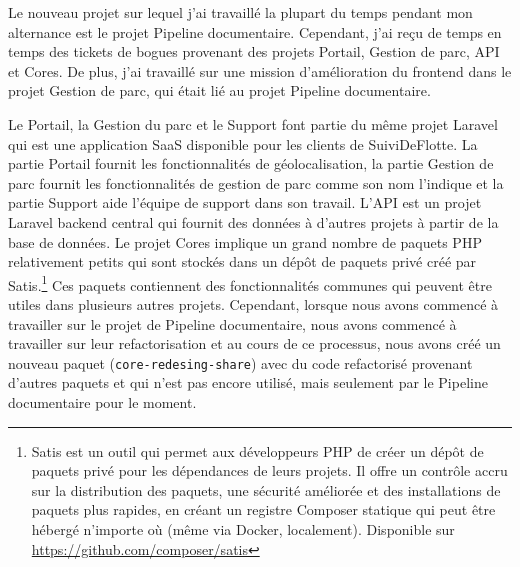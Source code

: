 Le nouveau projet sur lequel j'ai travaillé la plupart du temps pendant mon alternance est le projet Pipeline documentaire. Cependant, j'ai reçu de temps en temps des tickets de bogues provenant des projets Portail, Gestion de parc, API et Cores. De plus, j'ai travaillé sur une mission d'amélioration du frontend dans le projet Gestion de parc, qui était lié au projet Pipeline documentaire.

Le Portail, la Gestion du parc et le Support font partie du même projet Laravel qui est une application SaaS disponible pour les clients de SuiviDeFlotte. La partie Portail fournit les fonctionnalités de géolocalisation, la partie Gestion de parc fournit les fonctionnalités de gestion de parc comme son nom l'indique et la partie Support aide l'équipe de support dans son travail. L'API est un projet Laravel backend central qui fournit des données à d'autres projets à partir de la base de données. Le projet Cores implique un grand nombre de paquets PHP relativement petits qui sont stockés dans un dépôt de paquets privé créé par Satis.\footnote{Satis est un outil qui permet aux développeurs PHP de créer un dépôt de paquets privé pour les dépendances de leurs projets. Il offre un contrôle accru sur la distribution des paquets, une sécurité améliorée et des installations de paquets plus rapides, en créant un registre Composer statique qui peut être hébergé n'importe où (même via Docker, localement). Disponible sur \url{https://github.com/composer/satis}} Ces paquets contiennent des fonctionnalités communes qui peuvent être utiles dans plusieurs autres projets. Cependant, lorsque nous avons commencé à travailler sur le projet de Pipeline documentaire, nous avons commencé à travailler sur leur refactorisation et au cours de ce processus, nous avons créé un nouveau paquet (\texttt{core-redesing-share}) avec du code refactorisé provenant d'autres paquets et qui n'est pas encore utilisé, mais seulement par le Pipeline documentaire pour le moment.